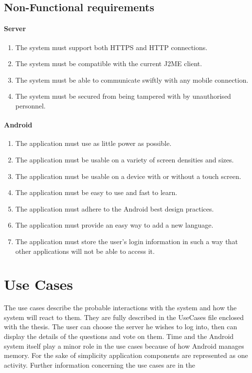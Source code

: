 \documentclass[11pt,twoside,a4paper]{book}
\begin{document}
\subsection{Non-Functional requirements}
\paragraph*{Server}
\begin{enumerate}
\item  The system must support both HTTPS and HTTP connections.
\item The system must be compatible with the current J2ME client.
\item The system must be able to communicate swiftly with any mobile connection.
\item The system must be secured from being tampered with by unauthorised personnel.
\end{enumerate}
\paragraph*{Android}
\begin{enumerate}
\item The application must use as little power as possible.
\item The application must be usable on a variety of screen densities and sizes.
\item The application must be usable on a device with or without a touch screen.
\item The application must be easy to use and fast to learn.
\item The application must adhere to the Android best design practices.
\item The application must provide an easy way to add a new language.
\item The application must store the user's login information in such a way that other applications will not be able to access it.
\end{enumerate}
\section{Use Cases}
The use cases describe the probable interactions with the system and how the system will react to them. They are fully described in the UseCases file enclosed with the thesis. The user can choose the server he wishes to log into, then can display the details of the questions and vote on them. Time and the Android system itself play a minor role in the use cases because of how Android manages memory. For the sake of simplicity application components are represented as one activity. Further information concerning the use cases are in the 
\end{document}
